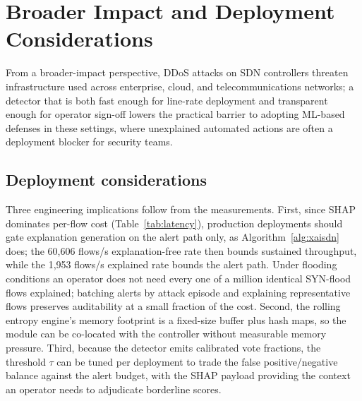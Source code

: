 \documentclass{ieeeaccess}
\begin{document}
\section{Broader Impact and Deployment Considerations}
\label{sec:discussion}

From a broader-impact perspective, DDoS attacks on SDN controllers threaten infrastructure used across enterprise, cloud, and telecommunications networks; a detector that is both fast enough for line-rate deployment and transparent enough for operator sign-off lowers the practical barrier to adopting ML-based defenses in these settings, where unexplained automated actions are often a deployment blocker for security teams.

\subsection{Deployment considerations}
Three engineering implications follow from the measurements. First, since SHAP dominates per-flow cost (Table~\ref{tab:latency}), production deployments should gate explanation generation on the alert path only, as Algorithm~\ref{alg:xaisdn} does; the 60,606 flows/s explanation-free rate then bounds sustained throughput, while the 1,953 flows/s explained rate bounds the alert path. Under flooding conditions an operator does not need every one of a million identical SYN-flood flows explained; batching alerts by attack episode and explaining representative flows preserves auditability at a small fraction of the cost. Second, the rolling entropy engine's memory footprint is a fixed-size buffer plus hash maps, so the module can be co-located with the controller without measurable memory pressure. Third, because the detector emits calibrated vote fractions, the threshold $\tau$ can be tuned per deployment to trade the false positive/negative balance against the alert budget, with the SHAP payload providing the context an operator needs to adjudicate borderline scores.
\end{document}
